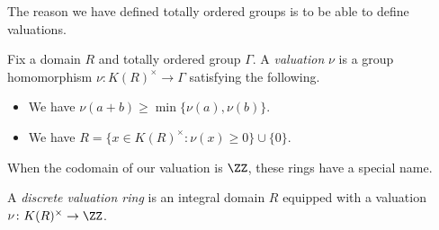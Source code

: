 The reason we have defined totally ordered groups is to be able to define valuations.
\begin{definition}[Valuation]
	Fix a domain $R$ and totally ordered group $\Gamma$. A \textit{valuation} $\nu$ is a group homomorphism $\nu\colon K(R)^\times\to\Gamma$ satisfying the following.
	\begin{itemize}
		\item We have $\nu(a+b)\ge\min\{\nu(a),\nu(b)\}$.
		\item We have $R=\{x\in K(R)^\times:\nu(x)\ge0\}\cup\{0\}$.
	\end{itemize}
\end{definition}
When the codomain of our valuation is $\ZZ$, these rings have a special name.
\begin{definition}
	A \textit{discrete valuation ring} is an integral domain $R$ equipped with a valuation $\nu\colon K(R)^\times\to\ZZ$.
\end{definition}

